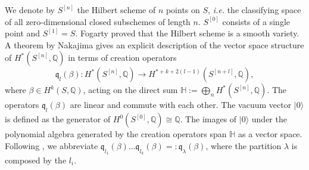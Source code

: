 \documentclass{amsart}
\newcommand{\hilb}[1]{^{[#1]}}
\newcommand{\ie}{{\it i.e. }}
\newcommand{\vac}{|0\rangle}
\newcommand{\IQ}{\mathbb{Q}}
\newcommand{\kq}{\mathfrak{q}}
\theoremstyle{plain}
\theoremstyle{definition}
\theoremstyle{remark}
\begin{document}
We denote by $S\hilb{n}$ the Hilbert scheme of $n$ points on $S$, \ie the classifying space of all zero-dimensional closed subschemes of length $n$. $S\hilb{0}$ consists of a single point and $S\hilb{1}=S$. Fogarty \cite[Thm.~2.4]{Fogarty} proved that the Hilbert scheme is a smooth variety.
A theorem by Nakajima \cite{Nakajima} gives an explicit description of the vector space structure of $H^\ast(S\hilb{n},\IQ)$ in terms of creation operators
$$
\kq_l(\beta) :  H^\ast(S\hilb{n},\IQ) \longrightarrow  H^{\ast+k+2(l-1)}(S\hilb{n+l},\IQ)
,$$ 
where $\beta\in H^k(S,\IQ)$, acting on the direct sum 
$\mathbb{H}:=\bigoplus_n H^\ast(S\hilb{n},\IQ)$. The operators $\kq_l(\beta)$ are linear and commute with each other. The vacuum vector $\vac$ is defined as the generator of $H^0(S\hilb{0},\IQ)\cong\IQ$. The images of $\vac$ under the polynomial algebra generated by the creation operators span $\mathbb{H}$ as a vector space. 
Following \cite{QinWang}, we abbreviate $\kq_{l_1}(\beta)\ldots\kq_{l_k}(\beta)=:\kq_\lambda(\beta)$, where the partition $\lambda$ is composed by the $l_i$. 
\end{document}
